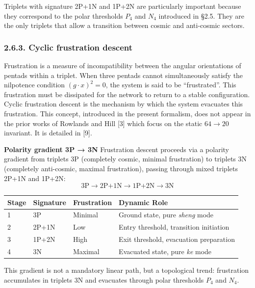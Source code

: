 \documentclass[11pt]{article}
\begin{document}
Triplets with signature 2P+1N and 1P+2N are particularly important
because they correspond to the polar thresholds \(P_4\) and \(N_4\)
introduced in §2.5. They are the only triplets that allow a transition
between cosmic and anti-cosmic sectors.

\hypertarget{cyclic-frustration-descent}{%
\subsubsection{2.6.3. Cyclic frustration
descent}\label{cyclic-frustration-descent}}

Frustration is a measure of incompatibility between the angular
orientations of pentads within a triplet. When three pentads cannot
simultaneously satisfy the nilpotence condition \((g\cdot x)^2=0\), the
system is said to be ``frustrated''. This frustration must be dissipated
for the network to return to a stable configuration. Cyclic frustration
descent is the mechanism by which the system evacuates this frustration.
This concept, introduced in the present formalism, does not appear in
the prior works of Rowlands and Hill {[}3{]} which focus on the static
\(64 \to 20\) invariant. It is detailed in {[}9{]}.

\textbf{Polarity gradient 3P → 3N} Frustration descent proceeds via a
polarity gradient from triplets 3P (completely cosmic, minimal
frustration) to triplets 3N (completely anti-cosmic, maximal
frustration), passing through mixed triplets 2P+1N and 1P+2N: \[
\text{3P} \rightarrow \text{2P+1N} \rightarrow \text{1P+2N} \rightarrow \text{3N}
\]

\begin{table}[H]
\centering
\begin{tabular}{@{}llll@{}}
\toprule
Stage & Signature & Frustration & Dynamic Role \\
\midrule
1 & 3P & Minimal & Ground state, pure \textit{sheng} mode \\
2 & 2P+1N & Low & Entry threshold, transition initiation \\
3 & 1P+2N & High & Exit threshold, evacuation preparation \\
4 & 3N & Maximal & Evacuated state, pure \textit{ke} mode \\
\bottomrule
\end{tabular}
\end{table}

This gradient is not a mandatory linear path, but a topological trend:
frustration accumulates in triplets 3N and evacuates through polar
thresholds \(P_4\) and \(N_4\).
\end{document}

